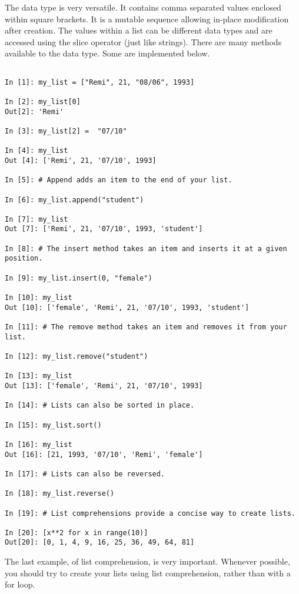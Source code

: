 \begin{example}

The  data type is very versatile. 
It contains comma separated values enclosed within square brackets. 
It is a mutable sequence allowing in-place modification after creation. 
The values within a list can be different data types and are accessed using the 
slice operator (just like strings). 
There are many methods available to the  data type. 
Some are implemented below. 

\begin{lstlisting}

In [1]: my_list = ["Remi", 21, "08/06", 1993]

In [2]: my_list[0]
Out[2]: 'Remi'

In [3]: my_list[2] =  "07/10"

In [4]: my_list
Out [4]: ['Remi', 21, '07/10', 1993]

In [5]: # Append adds an item to the end of your list.

In [6]: my_list.append("student")

In [7]: my_list
Out [7]: ['Remi', 21, '07/10', 1993, 'student']

In [8]: # The insert method takes an item and inserts it at a given position. 

In [9]: my_list.insert(0, "female")

In [10]: my_list
Out [10]: ['female', 'Remi', 21, '07/10', 1993, 'student']

In [11]: # The remove method takes an item and removes it from your list.

In [12]: my_list.remove("student")

In [13]: my_list
Out [13]: ['female', 'Remi', 21, '07/10', 1993]

In [14]: # Lists can also be sorted in place. 

In [15]: my_list.sort()

In [16]: my_list
Out [16]: [21, 1993, '07/10', 'Remi', 'female']

In [17]: # Lists can also be reversed.

In [18]: my_list.reverse()

In [19]: # List comprehensions provide a concise way to create lists. 

In [20]: [x**2 for x in range(10)]
Out[20]: [0, 1, 4, 9, 16, 25, 36, 49, 64, 81]

\end{lstlisting}

The last example, of list comprehension, is very important. Whenever possible, you should try to create your lists using list comprehension, rather than with a for loop.
\end{example}

